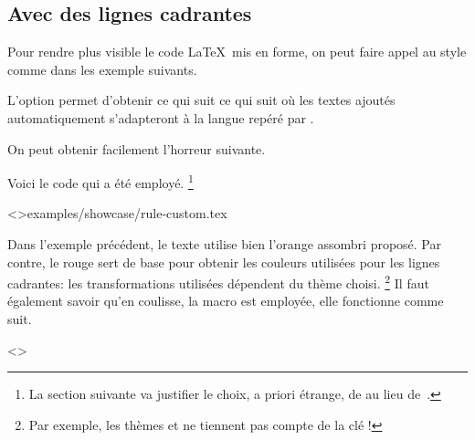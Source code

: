 \documentclass{tutodoc}
\begin{document}
\subsection{Avec des lignes cadrantes}

Pour rendre plus visible le code \LaTeX\ mis en forme, on peut faire appel au style  comme dans les exemple suivants.


\begin{tdocexa}
	L'option  permet d'obtenir ce qui suit ce qui suit où les textes ajoutés automatiquement s'adapteront à la langue repéré par \thisproj.

	
\end{tdocexa}


\begin{tdocexa}
	On peut obtenir facilement l'horreur suivante.

	

	Voici le code qui a été employé.%
	\footnote{
		La section suivante va justifier le choix, a priori étrange, de  au lieu de \,.
	}

	\tdoclatexinput<>{examples/showcase/rule-custom.tex}
\end{tdocexa}


\begin{tdocnote}
    Dans l'exemple précédent, le texte utilise bien l'orange assombri proposé. Par contre, le rouge sert de base pour obtenir les couleurs utilisées pour les lignes cadrantes: les transformations utilisées dépendent du thème choisi.%
    \footnote{
        Par exemple, les thèmes  et  ne tiennent pas compte de la clé  !
    }
    Il faut également savoir qu'en coulisse, la macro  est employée, elle fonctionne comme suit.

    \begin{tdoclatex}<>
    \end{tdoclatex}
\end{tdocnote}
\end{document}
